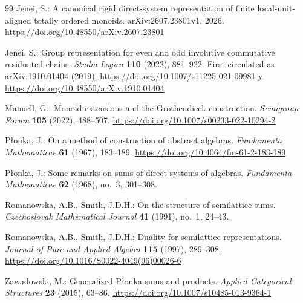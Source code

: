 \documentclass[pdflatex,sn-mathphys-num]{sn-jnl}
\theoremstyle{thmstyleone}%
\theoremstyle{thmstyletwo}%
\theoremstyle{thmstylethree}%
\begin{document}
\begin{thebibliography}{99}
Jenei, S.:
A canonical rigid direct-system representation of finite local-unit-aligned
totally ordered monoids.
arXiv:2607.23801v1, 2026.
\newline\url{https://doi.org/10.48550/arXiv.2607.23801}

Jenei, S.:
Group representation for even and odd involutive commutative residuated chains.
\emph{Studia Logica}
\textbf{110} (2022), 881--922.
First circulated as arXiv:1910.01404 (2019).
\newline\url{https://doi.org/10.1007/s11225-021-09981-y}
\newline\url{https://doi.org/10.48550/arXiv.1910.01404}

Manuell, G.:
Monoid extensions and the Grothendieck construction.
\emph{Semigroup Forum} \textbf{105} (2022), 488--507.
\newline\url{https://doi.org/10.1007/s00233-022-10294-2}

P\l{}onka, J.:
On a method of construction of abstract algebras.
\emph{Fundamenta Mathematicae} \textbf{61} (1967), 183--189.
\newline\url{https://doi.org/10.4064/fm-61-2-183-189}

P\l{}onka, J.:
Some remarks on sums of direct systems of algebras.
\emph{Fundamenta Mathematicae} \textbf{62} (1968), no.~3, 301--308.

Romanowska, A.B., Smith, J.D.H.:
On the structure of semilattice sums.
\emph{Czechoslovak Mathematical Journal} \textbf{41} (1991), no.~1, 24--43.

Romanowska, A.B., Smith, J.D.H.:
Duality for semilattice representations.
\emph{Journal of Pure and Applied Algebra} \textbf{115} (1997), 289--308.
\newline\url{https://doi.org/10.1016/S0022-4049(96)00026-6}

Zawadowski, M.:
Generalized P\l{}onka sums and products.
\emph{Applied Categorical Structures} \textbf{23} (2015), 63--86.
\newline\url{https://doi.org/10.1007/s10485-013-9364-1}

\end{thebibliography}
\end{document}
